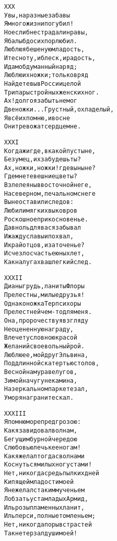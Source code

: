 \begin{minipage}[t]{\dimexpr 0.5\textwidth -\tabcolsep-.5pt}
\begin{alltt}\normalfont\centering
XXX
Увы, на разные забавы
Я много жизни погубил!
Но если б не страдали нравы,
Я балы б до сих пор любил.
Люблю я бешеную младость,
И тесноту, и блеск, и радость,
И дам обдуманный наряд;
Люблю их ножки; только вряд
Найдете вы в России целой
Три пары стройных женских ног.
Ах! долго я забыть не мог
Две ножки... Грустный, охладелый,
Я всё их помню, и во сне
Они тревожат сердце мне.
\end{alltt}
\end{minipage}
\clearpage

\begin{minipage}[t]{\dimexpr 0.5\textwidth -\tabcolsep-.5pt}
\begin{alltt}\normalfont\centering
XXXI
Когда ж и где, в какой пустыне,
Безумец, их забудешь ты?
Ах, ножки, ножки! где вы ныне?
Где мнете вешние цветы?
Взлелеяны в восточной неге,
На северном, печальном снеге
Вы не оставили следов:
Любили мягких вы ковров
Роскошное прикосновенье.
Давно ль для вас я забывал
И жажду славы и похвал,
И край отцов, и заточенье?
Исчезло счастье юных лет,
Как на лугах ваш легкий след.
\end{alltt}
\end{minipage}

\begin{minipage}[t]{\dimexpr 0.5\textwidth -\tabcolsep-.5pt}
\begin{alltt}\normalfont\centering
XXXII
Дианы грудь, ланиты Флоры
Прелестны, милые друзья!
Однако ножка Терпсихоры
Прелестней чем-то для меня.
Она, пророчествуя взгляду
Неоцененную награду,
Влечет условною красой
Желаний своевольный рой.
Люблю ее, мой друг Эльвина,
Под длинной скатертью столов,
Весной на мураве лугов,
Зимой на чугуне камина,
На зеркальном паркете зал,
У моря на граните скал.
\end{alltt}
\end{minipage}
\clearpage

\begin{minipage}[t]{\dimexpr 0.5\textwidth -\tabcolsep-.5pt}
\begin{alltt}\normalfont\centering
XXXIII
Я помню море пред грозою:
Как я завидовал волнам,
Бегущим бурной чередою
С любовью лечь к ее ногам!
Как я желал тогда с волнами
Коснуться милых ног устами!
Нет, никогда средь пылких дней
Кипящей младости моей
Я не желал с таким мученьем
Лобзать уста младых Армид,
Иль розы пламенных ланит,
Иль перси, полные томленьем;
Нет, никогда порыв страстей
Так не терзал души моей!
\end{alltt}
\end{minipage}

